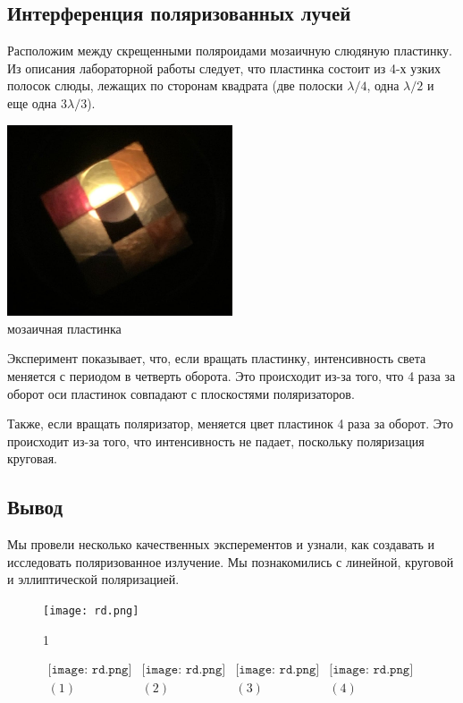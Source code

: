 \subsection*{Интерференция поляризованных лучей}
Расположим между скрещенными поляроидами мозаичную слюдяную пластинку. Из описания лабораторной работы следует, что пластинка состоит из 4-х узких полосок слюды, лежащих по сторонам квадрата (две полоски $\lambda/4$, одна $\lambda/2$ и еще одна $3\lambda/3$).

\begin{center}
\includegraphics[width=0.50\textwidth]{6.png}\\
мозаичная пластинка
\end{center}

Эксперимент показывает, что, если вращать пластинку, интенсивность света меняется с периодом в четверть оборота. Это происходит из-за того, что 4 раза за оборот оси пластинок совпадают с плоскостями поляризаторов.

Также, если вращать поляризатор, меняется цвет пластинок 4 раза за оборот. Это происходит из-за того, что интенсивность не падает, поскольку поляризация круговая.

\subsection*{Вывод}
Мы провели несколько качественных эксперементов и узнали, как создавать и исследовать поляризованное излучение. Мы познакомились с линейной, круговой и эллиптической поляризацией.










\lipsum[1-4]
\begin{figure}
\centering
\texttt{[image: rd.png]}
\caption{1}
\end{figure}
\lipsum[1-6]


\begin{figure}[h]
\begin{center}$
\begin{array}{cccc}
\texttt{[image: rd.png]}&
\texttt{[image: rd.png]}&
\texttt{[image: rd.png]}&
\texttt{[image: rd.png]}\\
(1) & (2) & (3) & (4)
\end{array}$
\end{center}
\end{figure}
